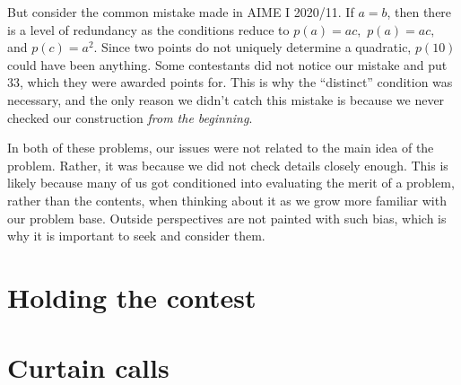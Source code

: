 \documentclass[points=false]{bounce}
\begin{document}
But consider the common mistake made in AIME I 2020/11. If $a=b$, then there is a level of redundancy as the conditions reduce to $p(a)=ac,$ $p(a)=ac,$ and $p(c)=a^2$. Since two points do not uniquely determine a quadratic, $p(10)$ could have been anything. Some contestants did not notice our mistake and put $33$, which they were awarded points for. This is why the ``distinct'' condition was necessary, and the only reason we didn't catch this mistake is because we never checked our construction \emph{from the beginning}.

In both of these problems, our issues were not related to the main idea of the problem. Rather, it was because we did not check details closely enough. This is likely because many of us got conditioned into evaluating the merit of a problem, rather than the contents, when thinking about it as we grow more familiar with our problem base. Outside perspectives are not painted with such bias, which is why it is important to seek and consider them.

\section{Holding the contest}

\section{Curtain calls}
\end{document}
